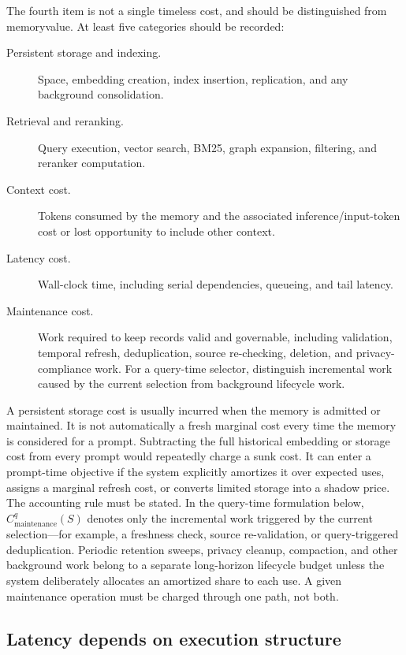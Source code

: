 The fourth item is not a single timeless cost, and should be distinguished from \gls{memoryvalue}. At least five categories should be recorded:

\begin{description}
  \item[Persistent storage and indexing.] Space, embedding creation, index insertion, replication, and any background consolidation.
  \item[Retrieval and reranking.] Query execution, vector search, BM25, graph expansion, filtering, and reranker computation.
  \item[Context cost.] Tokens consumed by the memory and the associated inference/input-token cost or lost opportunity to include other context.
  \item[Latency cost.] Wall-clock time, including serial dependencies, queueing, and tail latency.
  \item[Maintenance cost.] Work required to keep records valid and governable, including validation, temporal refresh, deduplication, source re-checking, deletion, and privacy-compliance work. For a query-time selector, distinguish incremental work caused by the current selection from background lifecycle work.
\end{description}

A persistent storage cost is usually incurred when the memory is admitted or maintained. It is not automatically a fresh marginal cost every time the memory is considered for a prompt. Subtracting the full historical embedding or storage cost from every prompt would repeatedly charge a sunk cost. It can enter a prompt-time objective if the system explicitly amortizes it over expected uses, assigns a marginal refresh cost, or converts limited storage into a shadow price. The accounting rule must be stated. In the query-time formulation below, \(C_{\mathrm{maintenance}}^{q}(S)\) denotes only the incremental work triggered by the current selection—for example, a freshness check, source re-validation, or query-triggered deduplication. Periodic retention sweeps, privacy cleanup, compaction, and other background work belong to a separate long-horizon lifecycle budget unless the system deliberately allocates an amortized share to each use. A given maintenance operation must be charged through one path, not both.

\subsection{Latency depends on execution structure}
\label{subsec:ch12-latency-structure}

